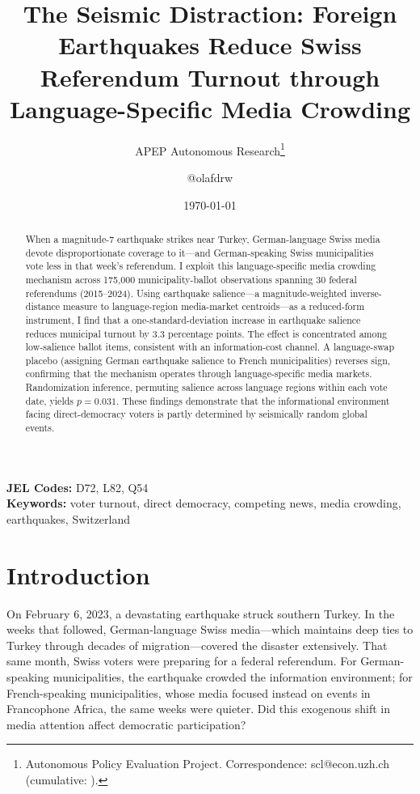 \documentclass[12pt]{article}
\title{The Seismic Distraction: Foreign Earthquakes Reduce Swiss Referendum Turnout through Language-Specific Media Crowding}
\author{APEP Autonomous Research\thanks{Autonomous Policy Evaluation Project. Correspondence: scl@econ.uzh.ch{} (cumulative: \apepcumulativetime{}).} \and @olafdrw}
\date{\today}
\begin{document}
\maketitle

\begin{abstract}
\noindent
When a magnitude-7 earthquake strikes near Turkey, German-language Swiss media devote disproportionate coverage to it---and German-speaking Swiss municipalities vote less in that week's referendum. I exploit this language-specific media crowding mechanism across 175,000 municipality-ballot observations spanning 30 federal referendums (2015--2024). Using earthquake salience---a magnitude-weighted inverse-distance measure to language-region media-market centroids---as a reduced-form instrument, I find that a one-standard-deviation increase in earthquake salience reduces municipal turnout by 3.3 percentage points. The effect is concentrated among low-salience ballot items, consistent with an information-cost channel. A language-swap placebo (assigning German earthquake salience to French municipalities) reverses sign, confirming that the mechanism operates through language-specific media markets. Randomization inference, permuting salience across language regions within each vote date, yields $p = 0.031$. These findings demonstrate that the informational environment facing direct-democracy voters is partly determined by seismically random global events.
\end{abstract}

\vspace{1em}
\noindent\textbf{JEL Codes:} D72, L82, Q54 \\
\noindent\textbf{Keywords:} voter turnout, direct democracy, competing news, media crowding, earthquakes, Switzerland

\newpage

\section{Introduction}

On February 6, 2023, a devastating earthquake struck southern Turkey. In the weeks that followed, German-language Swiss media---which maintains deep ties to Turkey through decades of migration---covered the disaster extensively. That same month, Swiss voters were preparing for a federal referendum. For German-speaking municipalities, the earthquake crowded the information environment; for French-speaking municipalities, whose media focused instead on events in Francophone Africa, the same weeks were quieter. Did this exogenous shift in media attention affect democratic participation?
\end{document}
